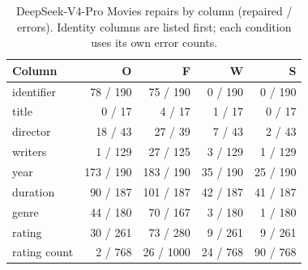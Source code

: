 \begin{table}[t]
  \caption{DeepSeek-V4-Pro Movies repairs by column (repaired / errors). Identity columns
  are listed first; each condition uses its own error counts.}
  \label{tab:moviescols}
  \small
  \setlength{\tabcolsep}{4pt}
  \begin{tabular*}{\columnwidth}{@{\extracolsep{\fill}}lrrrr@{}}
    \toprule
    Column & O & F & W & S \\
    \midrule
    identifier & 78 / 190 & 75 / 190 & 0 / 190 & 0 / 190 \\
    title & 0 / 17 & 4 / 17 & 1 / 17 & 0 / 17 \\
    director & 18 / 43 & 27 / 39 & 7 / 43 & 2 / 43 \\
    writers & 1 / 129 & 27 / 125 & 3 / 129 & 1 / 129 \\
    \midrule
    year & 173 / 190 & 183 / 190 & 35 / 190 & 25 / 190 \\
    duration & 90 / 187 & 101 / 187 & 42 / 187 & 41 / 187 \\
    genre & 44 / 180 & 70 / 167 & 3 / 180 & 1 / 180 \\
    rating & 30 / 261 & 73 / 280 & 9 / 261 & 9 / 261 \\
    rating count & 2 / 768 & 26 / 1000 & 24 / 768 & 90 / 768 \\
    \bottomrule
  \end{tabular*}
\end{table}
